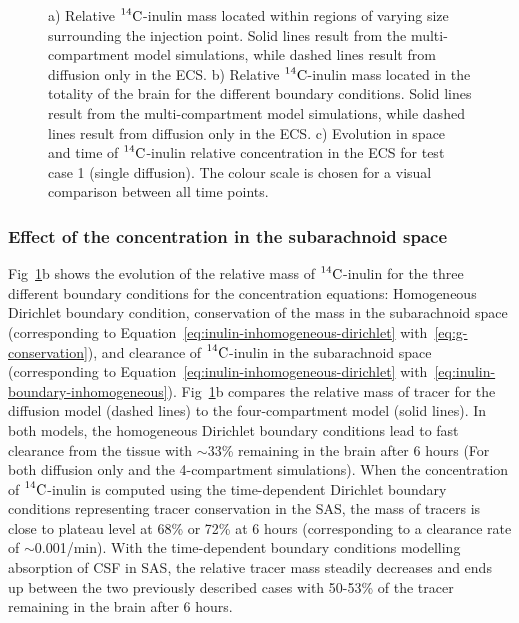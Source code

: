\documentclass[a4paper,11pt]{article}
\newcommand{\1}{^{(1)}}
\newcommand{\2}{^{(2)}}
\newcommand{\Cinulin}{$\prescript{14}{}{\text{C}}$-inulin }
\begin{document}
\begin{figure}
    \centering
    \caption{a) Relative \Cinulin mass located within regions of varying size surrounding the injection point. Solid lines result from the multi-compartment model simulations, while dashed lines result from diffusion only in the ECS. b) Relative \Cinulin mass located in the totality of the brain for the different boundary conditions. Solid lines result from the multi-compartment model simulations, while dashed lines result from diffusion only in the ECS. c) Evolution in space and time of \Cinulin relative concentration in the ECS for test case 1 (single diffusion). The colour scale is chosen for a visual comparison between all time points.}
    \label{fig:samples-Inulin}
\end{figure}

\subsubsection{Effect of the concentration in the subarachnoid space}\label{subsection:resu-bound}
Fig~\ref{fig:samples-Inulin}b shows the evolution of the relative mass of \Cinulin for the three different boundary conditions for the concentration equations: Homogeneous Dirichlet boundary condition, conservation of the mass in the subarachnoid space (corresponding to Equation~\eqref{eq:inulin-inhomogeneous-dirichlet} with~\eqref{eq:g-conservation}), and clearance of \Cinulin in the subarachnoid space (corresponding to Equation~\eqref{eq:inulin-inhomogeneous-dirichlet} with~\eqref{eq:inulin-boundary-inhomogeneous}). Fig~\ref{fig:samples-Inulin}b compares the relative mass of tracer for the diffusion model (dashed lines) to the four-compartment model (solid lines). In both models, the homogeneous Dirichlet boundary conditions lead to fast clearance from the tissue with $\sim$33\% remaining in the brain after 6 hours (For both diffusion only and the 4-compartment simulations). When the concentration of \Cinulin is computed using the time-dependent Dirichlet boundary conditions representing tracer conservation in the SAS, the mass of tracers is close to plateau level at 68\% or 72\% at 6 hours (corresponding to a clearance rate of $\sim$0.001/min). With the time-dependent boundary conditions modelling absorption of CSF in SAS, the relative tracer mass steadily decreases and ends up between the two previously described cases with 50-53\%  of the tracer remaining in the brain after 6 hours. 
\end{document}
